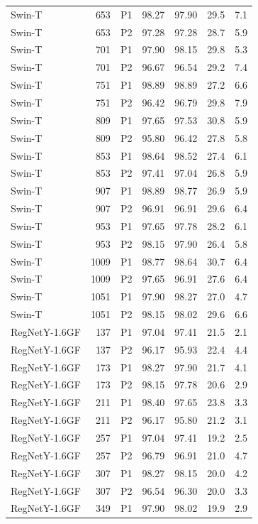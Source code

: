 {\begin{longtable}{lrlrrrr}
Swin-T & 653 & P1 & 98.27 & 97.90 & 29.5 & 7.1 \\
Swin-T & 653 & P2 & 97.28 & 97.28 & 28.7 & 5.9 \\
Swin-T & 701 & P1 & 97.90 & 98.15 & 29.8 & 5.3 \\
Swin-T & 701 & P2 & 96.67 & 96.54 & 29.2 & 7.4 \\
Swin-T & 751 & P1 & 98.89 & 98.89 & 27.2 & 6.6 \\
Swin-T & 751 & P2 & 96.42 & 96.79 & 29.8 & 7.9 \\
Swin-T & 809 & P1 & 97.65 & 97.53 & 30.8 & 5.9 \\
Swin-T & 809 & P2 & 95.80 & 96.42 & 27.8 & 5.8 \\
Swin-T & 853 & P1 & 98.64 & 98.52 & 27.4 & 6.1 \\
Swin-T & 853 & P2 & 97.41 & 97.04 & 26.8 & 5.9 \\
Swin-T & 907 & P1 & 98.89 & 98.77 & 26.9 & 5.9 \\
Swin-T & 907 & P2 & 96.91 & 96.91 & 29.6 & 6.4 \\
Swin-T & 953 & P1 & 97.65 & 97.78 & 28.2 & 6.1 \\
Swin-T & 953 & P2 & 98.15 & 97.90 & 26.4 & 5.8 \\
Swin-T & 1009 & P1 & 98.77 & 98.64 & 30.7 & 6.4 \\
Swin-T & 1009 & P2 & 97.65 & 96.91 & 27.6 & 6.4 \\
Swin-T & 1051 & P1 & 97.90 & 98.27 & 27.0 & 4.7 \\
Swin-T & 1051 & P2 & 98.15 & 98.02 & 29.6 & 6.6 \\
RegNetY-1.6GF & 137 & P1 & 97.04 & 97.41 & 21.5 & 2.1 \\
RegNetY-1.6GF & 137 & P2 & 96.17 & 95.93 & 22.4 & 4.4 \\
RegNetY-1.6GF & 173 & P1 & 98.27 & 97.90 & 21.7 & 4.1 \\
RegNetY-1.6GF & 173 & P2 & 98.15 & 97.78 & 20.6 & 2.9 \\
RegNetY-1.6GF & 211 & P1 & 98.40 & 97.65 & 23.8 & 3.3 \\
RegNetY-1.6GF & 211 & P2 & 96.17 & 95.80 & 21.2 & 3.1 \\
RegNetY-1.6GF & 257 & P1 & 97.04 & 97.41 & 19.2 & 2.5 \\
RegNetY-1.6GF & 257 & P2 & 96.79 & 96.91 & 21.0 & 4.7 \\
RegNetY-1.6GF & 307 & P1 & 98.27 & 98.15 & 20.0 & 4.2 \\
RegNetY-1.6GF & 307 & P2 & 96.54 & 96.30 & 20.0 & 3.3 \\
RegNetY-1.6GF & 349 & P1 & 97.90 & 98.02 & 19.9 & 2.9 \\

\end{longtable}}
